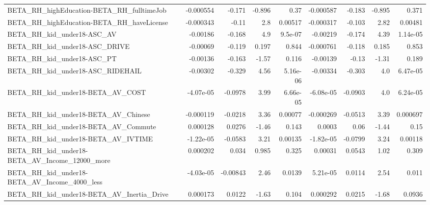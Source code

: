 \begin{tabular}{lrrrrrrrr}
BETA\_RH\_highEducation-BETA\_RH\_fulltimeJob          &   -0.000554 &       -0.171 &   -0.896 &     0.37 &  -0.000587 &      -0.183 &       -0.895 &         0.371 \\
BETA\_RH\_highEducation-BETA\_RH\_haveLicense          &   -0.000343 &        -0.11 &      2.8 &  0.00517 &  -0.000317 &      -0.103 &         2.82 &       0.00481 \\
BETA\_RH\_kid\_under18-ASC\_AV                         &    -0.00186 &       -0.168 &      4.9 &  9.5e-07 &   -0.00219 &      -0.174 &         4.39 &      1.14e-05 \\
BETA\_RH\_kid\_under18-ASC\_DRIVE                      &    -0.00069 &       -0.119 &    0.197 &    0.844 &  -0.000761 &      -0.118 &        0.185 &         0.853 \\
BETA\_RH\_kid\_under18-ASC\_PT                         &    -0.00136 &       -0.163 &    -1.57 &    0.116 &   -0.00139 &       -0.13 &        -1.31 &         0.189 \\
BETA\_RH\_kid\_under18-ASC\_RIDEHAIL                   &    -0.00302 &       -0.329 &     4.56 & 5.16e-06 &   -0.00334 &      -0.303 &          4.0 &      6.47e-05 \\
BETA\_RH\_kid\_under18-BETA\_AV\_COST                   &   -4.07e-05 &      -0.0978 &     3.99 & 6.66e-05 &  -6.08e-05 &     -0.0903 &          4.0 &      6.24e-05 \\
BETA\_RH\_kid\_under18-BETA\_AV\_Chinese                &   -0.000119 &      -0.0218 &     3.36 &  0.00077 &  -0.000269 &     -0.0513 &         3.39 &      0.000697 \\
BETA\_RH\_kid\_under18-BETA\_AV\_Commute                &    0.000128 &       0.0276 &    -1.46 &    0.143 &     0.0003 &        0.06 &        -1.44 &          0.15 \\
BETA\_RH\_kid\_under18-BETA\_AV\_IVTIME                 &   -1.22e-05 &      -0.0583 &     3.21 &  0.00135 &  -1.82e-05 &     -0.0799 &         3.24 &       0.00118 \\
BETA\_RH\_kid\_under18-BETA\_AV\_Income\_12000\_more      &    0.000202 &        0.034 &    0.985 &    0.325 &    0.00031 &      0.0543 &         1.02 &         0.309 \\
BETA\_RH\_kid\_under18-BETA\_AV\_Income\_4000\_less       &   -4.03e-05 &     -0.00843 &     2.46 &   0.0139 &   5.21e-05 &      0.0114 &         2.54 &         0.011 \\
BETA\_RH\_kid\_under18-BETA\_AV\_Inertia\_Drive          &    0.000173 &       0.0122 &    -1.63 &    0.104 &   0.000292 &      0.0215 &        -1.68 &        0.0936 \\

\end{tabular}
